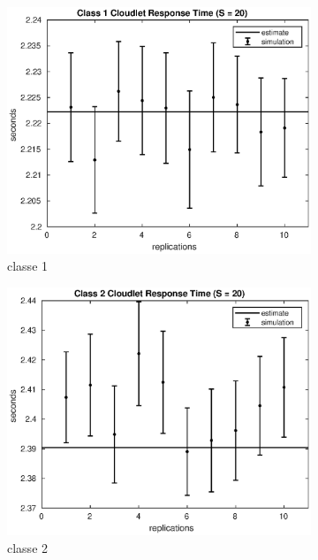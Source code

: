 \begin{figure}[!h]
\centering
%
\begin{subfigure}[t]{0.49\textwidth}
\includegraphics[width=\textwidth]{figures/simul/20_500K_s1clet}
\caption{classe 1}
\label{20_s1clet}
\end{subfigure}
%
\begin{subfigure}[t]{0.49\textwidth}
\includegraphics[width=\textwidth]{figures/simul/20_500K_s2clet}
\caption{classe 2}
\label{20_s2clet}
\end{subfigure}
%
\begin{subfigure}[t]{0.5\textwidth}

\end{subfigure}
\end{figure}
